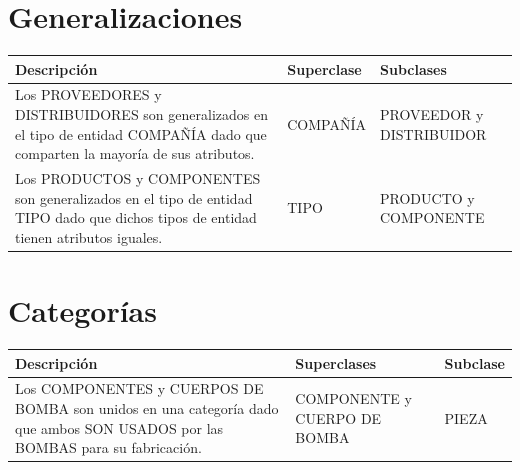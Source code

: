 \documentclass[]{report}
\begin{document}
	\section*{\centering Generalizaciones}
	\begin{center}
		\begin{tabular}{ | p{10cm} | p{3.5cm} | p{3.5cm}|}
			\hline
		
			Descripción & Superclase & Subclases \\
			\hline
		
			Los PROVEEDORES y DISTRIBUIDORES son generalizados en el tipo de entidad
			COMPAÑÍA dado que comparten la mayoría de sus atributos. & COMPAÑÍA & PROVEEDOR y 				DISTRIBUIDOR \\
			\hline
			
			Los PRODUCTOS y COMPONENTES son generalizados en el tipo de entidad
			TIPO dado que dichos tipos de entidad tienen atributos iguales. 
			& TIPO & PRODUCTO y COMPONENTE \\
			\hline
			
		\end{tabular}
	\end{center}
	
	\section*{\centering Categorías}
	\begin{center}
		\begin{tabular}{ | p{10cm} | p{3.5cm} | p{3.5cm}|}
			\hline
		
			Descripción & Superclases & Subclase \\
			\hline
		
		 	Los COMPONENTES y CUERPOS DE BOMBA son unidos en una categoría dado que
		 	ambos SON USADOS por las BOMBAS para su fabricación. & COMPONENTE y 
		 	CUERPO DE BOMBA & PIEZA \\
			\hline		
			
		\end{tabular}
	\end{center}
	
	
	
\end{document}
